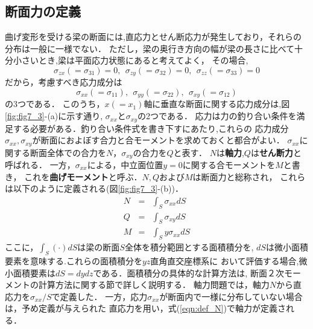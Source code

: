 \documentclass[10pt,a4j]{jbook}
\begin{document}
\subsection{断面力の定義}
曲げ変形を受ける梁の断面には,直応力とせん断応力が発生しており，それらの分布は一般に一様でない．
ただし，梁の奥行き方向の幅が梁の長さに比べて十分小さいとき,梁は平面応力状態にあると考えてよく，
その場合,
\begin{equation}
	\sigma_{zx}(=\sigma_{31})=0, \ \ 
	\sigma_{zy}(=\sigma_{32})=0, \ \ 
	\sigma_{zz}(=\sigma_{33})=0
\end{equation}
だから，考慮すべき応力成分は
\begin{equation}
	\sigma_{xx}(=\sigma_{11}), \ \ 
	\sigma_{yy}(=\sigma_{22}), \ \ 
	\sigma_{xy}(=\sigma_{12})
\end{equation}
の3つである．
このうち，$x(=x_1)$軸に垂直な断面に関する応力成分は,図\ref{fig:fig7_3}-(a)に示す通り,
$\sigma_{xx}$と$\sigma_{xy}$の2つである．
応力は力の釣り合い条件を満足する必要がある．釣り合い条件式を書き下すにあたり,これらの
応力成分$\sigma_{xx},\sigma_{xy}$が断面におよぼす合力と合モーメントを求めておくと都合がよい．
$\sigma_{xx}$に関する断面全体での合力を$N$，$\sigma_{xy}$の合力を$Q$と表す．
$N$は{\bf 軸力},$Q$は{\bf せん断力}と呼ばれる．
一方，$\sigma_{xx}$による，中立面位置$y=0$に関する合モーメントを$M$と書き，
これを{\bf 曲げモーメント}と呼ぶ．$N,Q$および$M$は断面力と総称され，
これらは以下のように定義される(図\ref{fig:fig7_3}-(b))．
\begin{eqnarray}
	N &=& \int_S \sigma_{xx} dS 
	\label{eqn:def_N}\\
	Q &=& \int_S \sigma_{xy} dS
	\label{eqn:def_Q}\\
	M &=& \int_S y\sigma_{xx} dS
	\label{eqn:def_M}
\end{eqnarray}
ここに，$\int_S(\cdot)dS$は梁の断面$S$全体を積分範囲とする面積積分を, 
$dS$は微小面積要素を意味する.これらの面積積分を$yz$直角直交座標系に
おいて評価する場合,微小面積要素は$dS=dydz$である．面積積分の具体的な計算方法は,
断面２次モーメントの計算方法に関する節で詳しく説明する．
軸力問題では，軸力$N$から直応力を$\sigma_{xx}/S$で定義した．
一方，応力$\sigma_{xx}$が断面内で一様に分布していない場合は，予め定義が与えられた
直応力を用い，式(\ref{eqn:def_N})で軸力が定義される．
\end{document}
